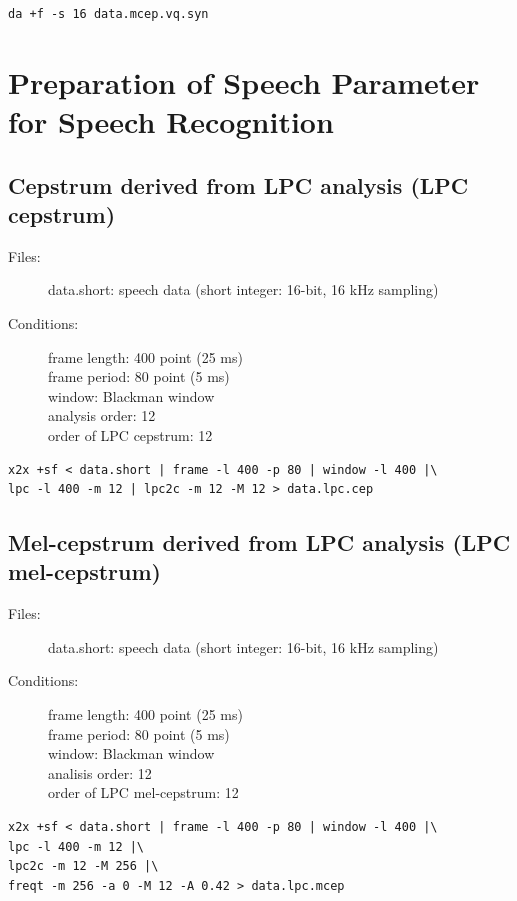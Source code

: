 \documentclass[a4paper]{article}
\begin{document}
\begin{verbatim}
da +f -s 16 data.mcep.vq.syn
\end{verbatim}

\section{Preparation of Speech Parameter for Speech Recognition}

\subsection{Cepstrum derived from LPC analysis (LPC cepstrum)}

\begin{description}
\item[Files:] 
  data.short: speech data (short integer: 16-bit, 16 kHz sampling)
\item[Conditions:]
  frame length: 400 point (25 ms)\\
  frame period: 80 point (5 ms)\\
  window: Blackman window\\
  analysis order: 12\\
  order of LPC cepstrum: 12
\end{description}

\begin{verbatim}
x2x +sf < data.short | frame -l 400 -p 80 | window -l 400 |\
lpc -l 400 -m 12 | lpc2c -m 12 -M 12 > data.lpc.cep
\end{verbatim}

\subsection{Mel-cepstrum derived from LPC analysis
  (LPC mel-cepstrum)}

\begin{description}
\item[Files:]
  data.short: speech data (short integer: 16-bit, 16 kHz sampling)
\item[Conditions:]
  frame length: 400 point (25 ms)\\
  frame period: 80 point (5 ms)\\
  window: Blackman window\\
  analisis order: 12\\
  order of LPC mel-cepstrum: 12
\end{description}

\begin{verbatim}
x2x +sf < data.short | frame -l 400 -p 80 | window -l 400 |\
lpc -l 400 -m 12 |\
lpc2c -m 12 -M 256 |\
freqt -m 256 -a 0 -M 12 -A 0.42 > data.lpc.mcep
\end{verbatim}
\end{document}
